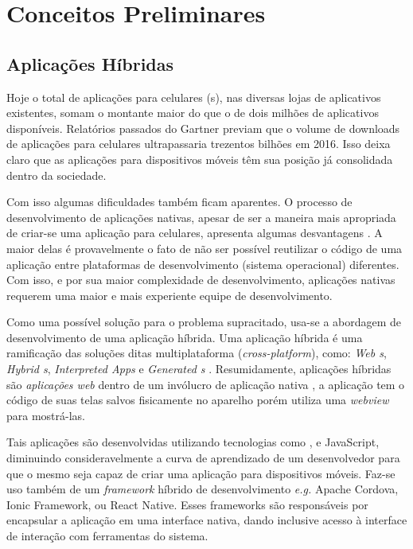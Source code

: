 \documentclass[12pt]{report} %
\begin{document}
\chapter{Conceitos Preliminares}
\label{sec:conceitos_preliminares}

\section{Aplicações Híbridas}
Hoje o total de aplicações para celulares (s), nas diversas lojas de aplicativos existentes, somam o montante maior do que o de dois milhões \cite{malavolta} de aplicativos disponíveis. Relatórios passados do Gartner \cite{gartner} previam que o volume de downloads de aplicações para celulares ultrapassaria trezentos bilhões em 2016. Isso deixa claro que as aplicações para dispositivos móveis têm sua posição já consolidada dentro da sociedade.

Com isso algumas dificuldades também ficam aparentes. O processo de desenvolvimento de aplicações nativas, apesar de ser a maneira mais apropriada de criar-se uma aplicação para celulares, apresenta algumas desvantagens \cite{Xanthopoulos:2013:CAC:2490257.2490292}. A maior delas é provavelmente o fato de não ser possível reutilizar o código de uma aplicação entre plataformas de desenvolvimento (sistema operacional) diferentes. Com isso, e por sua maior complexidade de desenvolvimento, aplicações nativas requerem uma maior e mais experiente equipe de desenvolvimento.

Como uma possível solução para o problema supracitado, usa-se a abordagem de desenvolvimento de uma aplicação híbrida. Uma aplicação híbrida é uma ramificação das soluções ditas multiplataforma (\textit{cross-platform}), como: \textit{Web s}, \textit{Hybrid s}, \textit{Interpreted Apps} e \textit{Generated s} \cite{Xanthopoulos:2013:CAC:2490257.2490292}. Resumidamente, aplicações híbridas são \textit{aplicações web} dentro de um invólucro de aplicação nativa \cite{Serrano:2013:MWA:2553372.2553378}, a aplicação tem o código de suas telas salvos fisicamente no aparelho porém utiliza uma \textit{webview} para mostrá-las. 

Tais aplicações são desenvolvidas utilizando tecnologias como ,  e JavaScript, diminuindo consideravelmente a curva de aprendizado de um desenvolvedor para que o mesmo seja capaz de criar uma aplicação para dispositivos móveis. Faz-se uso também de um \textit{framework} híbrido de desenvolvimento \textit{e.g.} Apache Cordova, Ionic Framework, ou React Native. Esses frameworks são responsáveis por encapsular a aplicação em uma interface nativa, dando inclusive acesso à interface de interação com ferramentas do sistema.
\end{document}
